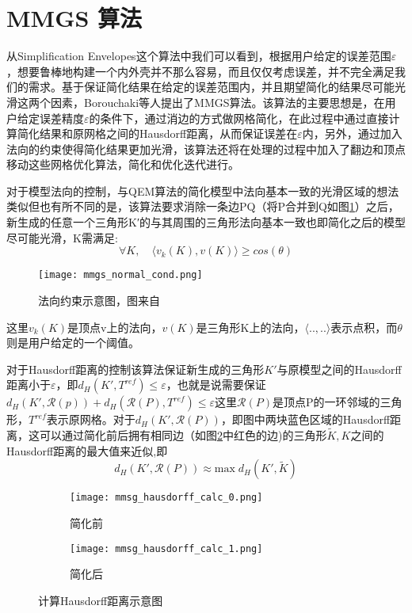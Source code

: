 \section{MMGS 算法}
从Simplification Envelopes\cite{simp-envlop}这个算法中我们可以看到，根据用户给定的误差范围$\varepsilon$，想要鲁棒地构建一个内外壳并不那么容易，而且仅仅考虑误差，并不完全满足我们的需求。基于保证简化结果在给定的误差范围内，并且期望简化的结果尽可能光滑这两个因素，Borouchaki等人提出了MMGS算法\cite{mmgs}。该算法的主要思想是，在用户给定误差精度$\varepsilon$的条件下，通过消边的方式做网格简化，在此过程中通过直接计算简化结果和原网格之间的Hausdorff距离，从而保证误差在$\varepsilon$内，另外，通过加入法向的约束使得简化结果更加光滑，该算法还将在处理的过程中加入了翻边和顶点移动这些网格优化算法，简化和优化迭代进行。\par
对于模型法向的控制，与QEM算法的简化模型中法向基本一致的光滑区域的想法类似但也有所不同的是，该算法要求消除一条边PQ（将P合并到Q如图\ref{fig:mmgs-normal-cond}）之后，新生成的任意一个三角形K′的与其周围的三角形法向基本一致也即简化之后的模型尽可能光滑，K需满足:
\begin{equation}
  \forall K, \quad \langle v_k (K), v(K) \rangle \ge cos(\theta)
\end{equation}
\begin{figure}[htbp]
    \centering
    \texttt{[image: mmgs\_normal\_cond.png]}
    \caption[法向约束]{法向约束示意图，图来自\cite{mmgs}}
    \label{fig:mmgs-normal-cond}
\end{figure}
这里$v_k(K)$是顶点v上的法向，$v(K)$是三角形K上的法向，$\langle ..,.. \rangle$表示点积，而$\theta$则是用户给定的一个阈值。\par
对于Hausdorff距离的控制该算法保证新生成的三角形$K'$与原模型之间的Hausdorff距离小于$\varepsilon$，即$d_H(K',T^{ref})\le\varepsilon$，也就是说需要保证$d_H(K',\mathcal{R}(p))+d_H(\mathcal{R}(P),T^{ref}) \le \varepsilon$这里$\mathcal{R}(P)$是顶点P的一环邻域的三角形，$T^{ref}$表示原网格。对于$d_H(K',\mathcal{R}(P))$，即图中两块蓝色区域的Hausdorff距离，这可以通过简化前后拥有相同边（如图\ref{fig:mmgs-calc-haus}中红色的边)的三角形$\widetilde{K},K$之间的Hausdorff距离的最大值来近似,即
\begin{equation}
  d_H(K', \mathcal{R}(P)) \approx \text{max} \; d_H(K',\widetilde{K})
\end{equation}
\begin{figure}[htbp]
  \centering
  \begin{subfigure}[b]{0.4\textwidth}
    \texttt{[image: mmsg\_hausdorff\_calc\_0.png]}
    \caption[input]{简化前}
    \end{subfigure}
    \begin{subfigure}[b]{0.4\textwidth}
      \texttt{[image: mmsg\_hausdorff\_calc\_1.png]}
      \caption[mls]{简化后}
    \end{subfigure}
    \caption[MMGS计算Hausdorff距离]{计算Hausdorff距离示意图}
    \label{fig:mmgs-calc-haus}
\end{figure}
